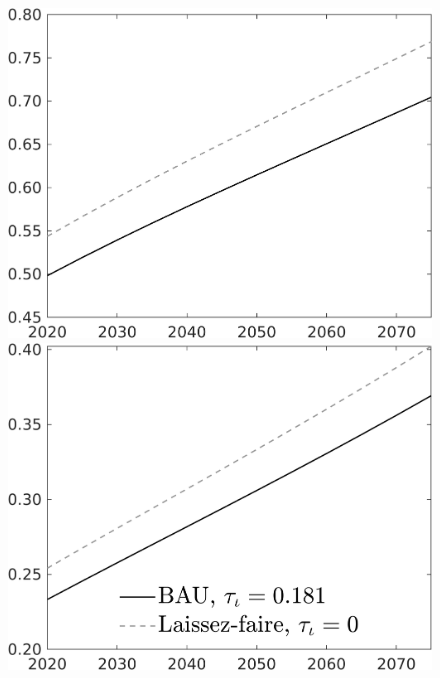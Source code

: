\documentclass[12pt]{article}
\begin{document}
\begin{figure}[h!!]
\begin{minipage}[]{0.32\textwidth}
	\end{minipage}	
	\begin{minipage}[]{0.32\textwidth}
		\includegraphics[width=1\textwidth]{../../codding_model/own_basedOnFried/optimalPol_010922_revision/figures/all_13Sept22/CompTaul_Equlab_LFBAU_Reg0_C_spillover0_nsk0_xgr1_knspil1_sep1_countec0_GovRev0_etaa0.79_lgd0.png}
	\end{minipage}	
	\begin{minipage}[]{0.32\textwidth}
		\includegraphics[width=1\textwidth]{../../codding_model/own_basedOnFried/optimalPol_010922_revision/figures/all_13Sept22/CompTaul_Equlab_LFBAU_Reg0_F_spillover0_nsk0_xgr1_knspil1_sep1_countec0_GovRev0_etaa0.79_lgd1.png}

\end{minipage}
\end{figure}
\end{document}
